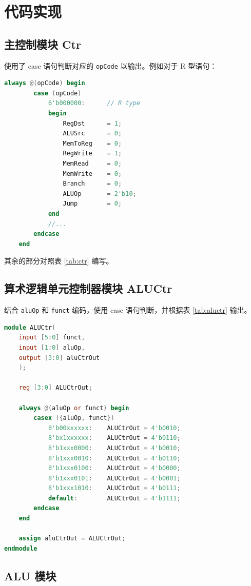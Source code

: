 \documentclass[a4paper,UTF8]{ctexart}
\begin{document}
\section{代码实现}

\subsection{主控制模块 Ctr}

使用了 case 语句判断对应的 \verb"opCode" 以输出。例如对于 R 型语句：
\begin{lstlisting}[language=verilog,caption=Ctr.v]
    always @(opCode) begin
        case (opCode)
            6'b000000:      // R type
            begin
                RegDst      = 1;
                ALUSrc      = 0;
                MemToReg    = 0;
                RegWrite    = 1;
                MemRead     = 0;
                MemWrite    = 0;
                Branch      = 0;
                ALUOp       = 2'b10;
                Jump        = 0;
            end
            //...
        endcase
    end
\end{lstlisting}

其余的部分对照表 \ref{tab:ctr} 编写。

\subsection{算术逻辑单元控制器模块 ALUCtr}

结合 \verb"aluOp" 和 \verb"funct" 编码，使用 case 语句判断，并根据表 \ref{tab:aluctr} 输出。
\begin{lstlisting}[language=verilog,caption=ALUCtr.v]
module ALUCtr(
    input [5:0] funct,
    input [1:0] aluOp,
    output [3:0] aluCtrOut
    );

    reg [3:0] ALUCtrOut;

    always @(aluOp or funct) begin
        casex ({aluOp, funct})
            8'b00xxxxxx:    ALUCtrOut = 4'b0010;
            8'bx1xxxxxx:    ALUCtrOut = 4'b0110;
            8'b1xxx0000:    ALUCtrOut = 4'b0010;
            8'b1xxx0010:    ALUCtrOut = 4'b0110;
            8'b1xxx0100:    ALUCtrOut = 4'b0000;
            8'b1xxx0101:    ALUCtrOut = 4'b0001;
            8'b1xxx1010:    ALUCtrOut = 4'b0111;
            default:        ALUCtrOut = 4'b1111;
        endcase
    end
    
    assign aluCtrOut = ALUCtrOut;
endmodule
\end{lstlisting}

\subsection{ALU 模块}
\end{document}
